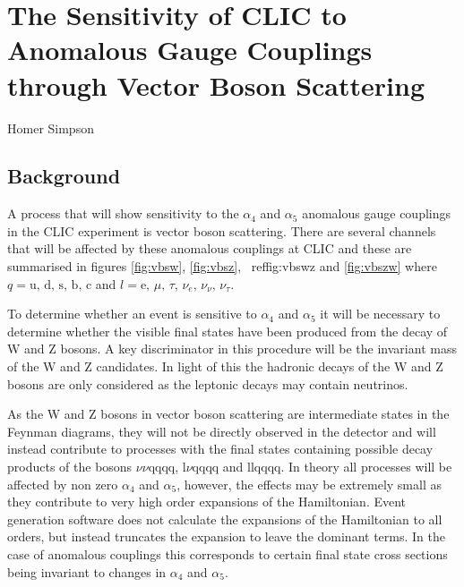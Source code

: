 \chapter{The Sensitivity of CLIC to Anomalous Gauge Couplings through Vector Boson Scattering}
\label{chap:PhysicsAnalysis}

%
{Homer Simpson}

\section{Background}
A process that will show sensitivity to the $\alpha_{4}$ and $\alpha_{5}$ anomalous gauge couplings in the CLIC experiment is vector boson scattering. There are several channels that will be affected by these anomalous couplings at CLIC and these are summarised in figures \ref{fig:vbsw}, \ref{fig:vbsz}, \ ref{fig:vbswz} and \ref{fig:vbszw} where $q = \text{u, d, s, b, c}$ and $l = \text{e, } \mu \text{, } \tau \text{, } \nu_{e} \text{, } \nu_{\nu} \text{, } \nu_{\tau}$.

To determine whether an event is sensitive to $\alpha_{4}$ and $\alpha_{5}$ it will be necessary to determine whether the visible final states have been produced from the decay of W and Z bosons. A key discriminator in this procedure will be the invariant mass of the W and Z candidates. In light of this the hadronic decays of the W and Z bosons are only considered as the leptonic decays may contain neutrinos.

As the W and Z bosons in vector boson scattering are intermediate states in the Feynman diagrams, they will not be directly observed in the detector and will instead contribute to processes with the final states containing possible decay products of the bosons $\nu\nu\text{qqqq}$, $\text{l}\nu\text{qqqq}$ and llqqqq. In theory all processes will be affected by non zero $\alpha_{4}$ and $\alpha_{5}$, however, the effects may be extremely small as they contribute to very high order expansions of the Hamiltonian. Event generation software does not calculate the expansions of the Hamiltonian to all orders, but instead truncates the expansion to leave the dominant terms. In the case of anomalous couplings this corresponds to certain final state cross sections being invariant to changes in $\alpha_{4}$ and $\alpha_{5}$.

\iffalse

